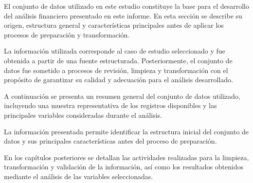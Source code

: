 


El conjunto de datos utilizado en este estudio constituye la base para el desarrollo del análisis financiero presentado en este informe. En esta sección se describe su origen, estructura general y características principales antes de aplicar los procesos de preparación y transformación.





La información utilizada corresponde al caso de estudio seleccionado y fue obtenida a partir de una fuente estructurada. Posteriormente, el conjunto de datos fue sometido a procesos de revisión, limpieza y transformación con el propósito de garantizar su calidad y adecuación para el análisis desarrollado.





A continuación se presenta un resumen general del conjunto de datos utilizado, incluyendo una muestra representativa de los registros disponibles y las principales variables consideradas durante el análisis.








La información presentada permite identificar la estructura inicial del conjunto de datos y sus principales características antes del proceso de preparación.

En los capítulos posteriores se detallan las actividades realizadas para la limpieza, transformación y validación de la información, así como los resultados obtenidos mediante el análisis de las variables seleccionadas.
